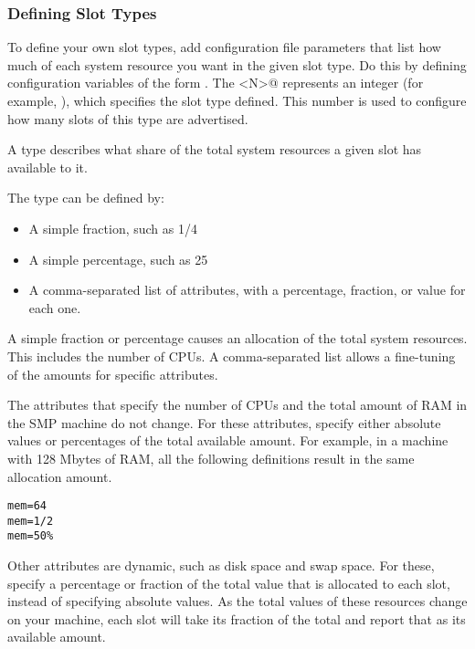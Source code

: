 \subsubsection{\label{sec:Slot-Type-Define}
Defining Slot Types}

To define your own slot types, add configuration file
parameters that list how much of each system resource you want in the
given slot type.  Do this by defining configuration
variables of the form
.
The \verb@<N>@ represents an integer (for example, 
), which specifies the slot type defined.
This number is used to configure how many slots of this type
are advertised.

A type describes what share of the total system resources a given
slot has available to it.

The type can be defined by:
\begin{itemize}
  \item A simple fraction, such as 1/4
  \item A simple percentage, such as 25\Percent
  \item A comma-separated list of attributes, with a percentage,
	fraction, or value for each one.
\end{itemize}
A simple fraction or percentage causes an allocation
of the total system resources.
This includes the number of CPUs.
A comma-separated list allows a fine-tuning of
the amounts for specific attributes.

The attributes that specify the number of CPUs
and the total amount of RAM in
the SMP machine do not change.
For these attributes, specify either absolute values or
percentages of the total available amount.  
For example, in a machine with 128 Mbytes of RAM,
all the following definitions result in the same allocation amount.
\begin{verbatim}
mem=64
mem=1/2
mem=50%
\end{verbatim}

Other attributes are dynamic, such as disk space and swap space.
For these, specify a percentage or fraction of the total
value that is allocated to each slot, instead of specifying absolute values.
As the total values of these resources change on your machine, each
slot will take its fraction of the total and report that as its
available amount.

